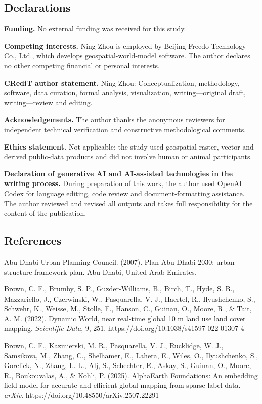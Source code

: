 \subsection{Declarations}\label{declarations}

\textbf{Funding.} No external funding was received for this study.

\textbf{Competing interests.} Ning Zhou is employed by Beijing Freedo
Technology Co., Ltd., which develops geospatial-world-model software.
The author declares no other competing financial or personal interests.

\textbf{CRediT author statement.} Ning Zhou: Conceptualization,
methodology, software, data curation, formal analysis, visualization,
writing---original draft, writing---review and editing.

\textbf{Acknowledgements.} The author thanks the anonymous reviewers for
independent technical verification and constructive methodological
comments.

\textbf{Ethics statement.} Not applicable; the study used geospatial
raster, vector and derived public-data products and did not involve
human or animal participants.

\textbf{Declaration of generative AI and AI-assisted technologies in the
writing process.} During preparation of this work, the author used
OpenAI Codex for language editing, code review and document-formatting
assistance. The author reviewed and revised all outputs and takes full
responsibility for the content of the publication.

\subsection{References}\label{references}

Abu Dhabi Urban Planning Council. (2007). Plan Abu Dhabi 2030: urban
structure framework plan. Abu Dhabi, United Arab Emirates.

Brown, C. F., Brumby, S. P., Guzder-Williams, B., Birch, T., Hyde, S.
B., Mazzariello, J., Czerwinski, W., Pasquarella, V. J., Haertel, R.,
Ilyushchenko, S., Schwehr, K., Weisse, M., Stolle, F., Hanson, C.,
Guinan, O., Moore, R., \& Tait, A. M. (2022). Dynamic World, near
real-time global 10 m land use land cover mapping. \emph{Scientific
Data}, 9, 251. https://doi.org/10.1038/s41597-022-01307-4

Brown, C. F., Kazmierski, M. R., Pasquarella, V. J., Rucklidge, W. J.,
Samsikova, M., Zhang, C., Shelhamer, E., Lahera, E., Wiles, O.,
Ilyushchenko, S., Gorelick, N., Zhang, L. L., Alj, S., Schechter, E.,
Askay, S., Guinan, O., Moore, R., Boukouvalas, A., \& Kohli, P. (2025).
AlphaEarth Foundations: An embedding field model for accurate and
efficient global mapping from sparse label data. \emph{arXiv}.
https://doi.org/10.48550/arXiv.2507.22291

